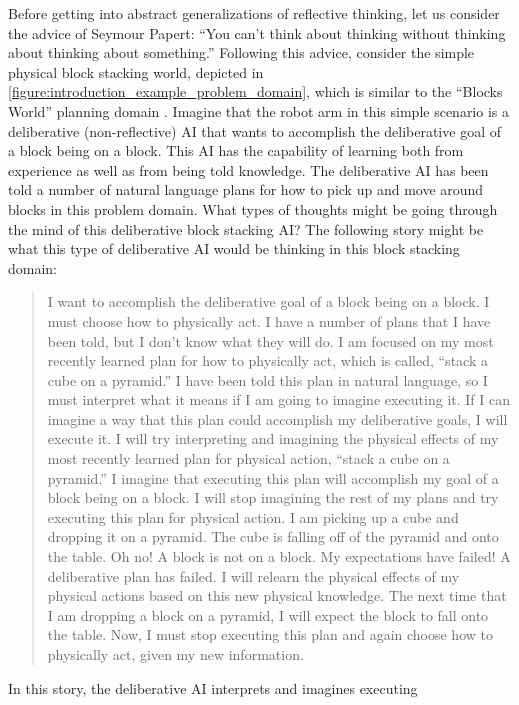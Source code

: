 Before getting into abstract generalizations of reflective thinking,
let us consider the advice of Seymour Papert: ``You can't think about
thinking without thinking about thinking about something.''  Following
this advice, consider the simple physical block stacking world,
depicted in {\autoref{figure:introduction_example_problem_domain}},
which is similar to the ``Blocks World'' planning domain
{\cite[]{winograd:1970}}.  Imagine that the robot arm in this simple
scenario is a deliberative (non-reflective) AI that wants to
accomplish the deliberative goal of a block being on a block.  This AI
has the capability of learning both from experience as well as from
being told knowledge.  The deliberative AI has been told a number of
natural language plans for how to pick up and move around blocks in
this problem domain.  What types of thoughts might be going through
the mind of this deliberative block stacking AI?  The following story
might be what this type of deliberative AI would be thinking in this
block stacking domain:
\begin{quote}
  I want to accomplish the deliberative goal of a block being on a
  block.  I must choose how to physically act.  I have a number of
  plans that I have been told, but I don't know what they will do.  I
  am focused on my most recently learned plan for how to physically
  act, which is called, ``stack a cube on a pyramid.''  I have been
  told this plan in natural language, so I must interpret what it
  means if I am going to imagine executing it.  If I can imagine a way
  that this plan could accomplish my deliberative goals, I will
  execute it.  I will try interpreting and imagining the physical
  effects of my most recently learned plan for physical action,
  ``stack a cube on a pyramid.''  I imagine that executing this plan
  will accomplish my goal of a block being on a block.  I will stop
  imagining the rest of my plans and try executing this plan for
  physical action.  I am picking up a cube and dropping it on a
  pyramid.  The cube is falling off of the pyramid and onto the table.
  Oh no!  A block is not on a block.  My expectations have failed!  A
  deliberative plan has failed.  I will relearn the physical effects
  of my physical actions based on this new physical knowledge.  The
  next time that I am dropping a block on a pyramid, I will expect the
  block to fall onto the table.  Now, I must stop executing this plan
  and again choose how to physically act, given my new information.
\end{quote}
In this story, the deliberative AI interprets and imagines executing
